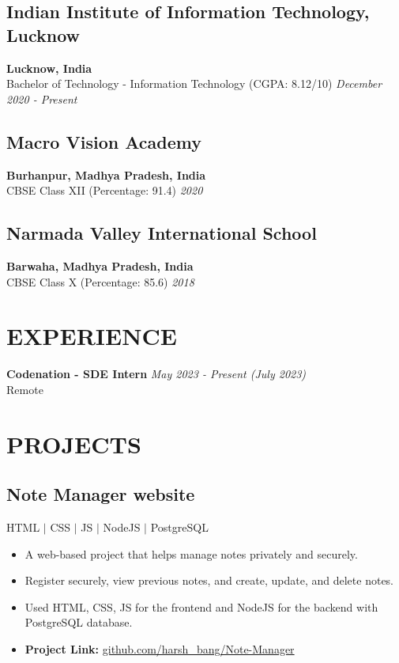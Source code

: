 \documentclass[12pt]{article}
\begin{document}
\subsection*{Indian Institute of Information Technology, Lucknow}	\hfill\textbf{Lucknow, India} \\
Bachelor of Technology - Information Technology (CGPA: 8.12/10) 	\hfill\textit{December 2020 - Present} \\
\subsection*{Macro Vision Academy}	\hfill\textbf{Burhanpur, Madhya Pradesh, India} \\
CBSE Class XII (Percentage: 91.4) \hfill \textit{2020} \\
\subsection*{Narmada Valley International School}	\hfill\textbf{Barwaha, Madhya Pradesh, India} \\
CBSE Class X (Percentage: 85.6) \hfill \textit{2018} \\

\section*{EXPERIENCE}
\textbf{Codenation - SDE Intern} \hfill \textit{May 2023 - Present (July 2023)} \\
Remote \\

\section*{PROJECTS}
\subsection*{Note Manager website} \quad HTML $|$ CSS $|$ JS $|$ NodeJS $|$ PostgreSQL \\
\begin{itemize}[topsep=0pt,itemsep=1pt,partopsep=3.5pt, parsep=1pt]
	\item A web-based project that helps manage notes privately and securely.
	\item Register securely, view previous notes, and create, update, and delete notes.
	\item Used HTML, CSS, JS for the frontend and NodeJS for the backend with PostgreSQL database.
	\item \textbf{Project Link:} \href{https://github.com/harsh_bang/Note-Manager}{github.com/harsh\_bang/Note-Manager}
\end{itemize}
\end{document}
